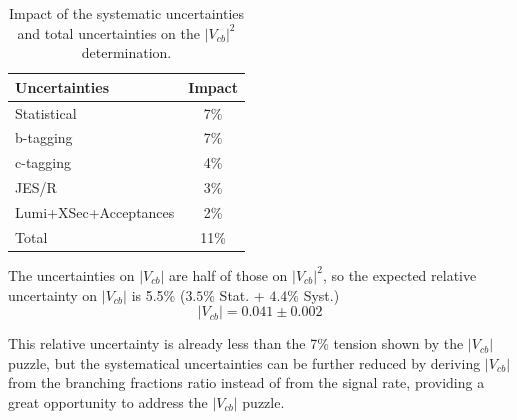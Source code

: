 \begin{table}[H]
    \centering
    \begin{tabular}{l|c}
    \toprule
    \textbf{Uncertainties} & \textbf{Impact}\\
    \midrule
         Statistical   & 7\% \\
         \midrule
         b-tagging   & 7\% \\
         c-tagging   & 4\% \\
         JES/R   & 3\% \\
         Lumi+XSec+Acceptances  & 2\% \\
         \midrule
         Total   & 11\%\\
         \bottomrule
    \end{tabular}
    \caption{Impact of the systematic uncertainties and total uncertainties on the $|V_{cb}|^2$ determination.}
    \label{tab:res}
\end{table}

The uncertainties on $|V_{cb}|$ are half of those on $|V_{cb}|^2$, so the expected relative uncertainty on $|V_{cb}|$ is 5.5\% ($3.5\%$ Stat. + $4.4\%$ Syst.)
\begin{equation*}
    |V_{cb}|=0.041 \pm 0.002
\end{equation*}

 This relative uncertainty is already less than the 7\% tension shown by the $|V_{cb}|$ puzzle, but the systematical uncertainties can be further reduced by deriving $|V_{cb}|$ from the branching fractions ratio instead of from the signal rate, providing a great opportunity to address the $|V_{cb}|$ puzzle.\\

